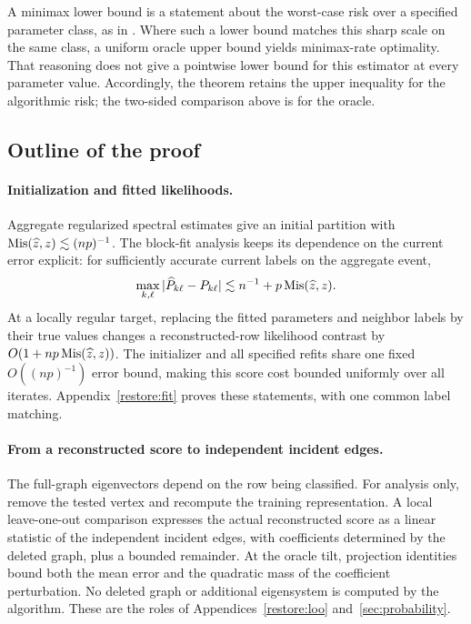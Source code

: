 A minimax lower bound is a statement about the worst-case risk over
a specified parameter class, as in
\citep{zhangzhou2016,zhouli,zhouamini2020}. Where such a lower bound
matches this sharp scale on the same class, a uniform oracle upper
bound yields minimax-rate optimality. That reasoning does not give
a pointwise lower bound for this estimator at every parameter value.
Accordingly, the theorem retains the upper inequality for the
algorithmic risk; the two-sided comparison above is for the oracle.

\subsection{Outline of the proof}\label{sec:proof-strategy}

\paragraph{Initialization and fitted likelihoods.}
Aggregate regularized spectral estimates give an initial partition
with $\operatorname{Mis}(\widehat z,z)\lesssim (np)^{-1}$. The block-fit analysis keeps its
dependence on the current error explicit: for sufficiently accurate current labels on the aggregate event,
\[
 \max_{k,\ell}|\widehat P_{k\ell}-P_{k\ell}|
 \lesssim n^{-1}+p\operatorname{Mis}(\widehat z,z).
\]
At a locally regular target, replacing the fitted parameters and
neighbor labels by their true values changes a reconstructed-row
likelihood contrast by $O(1+np\operatorname{Mis}(\widehat z,z))$. The initializer
and all specified refits share one fixed $O((np)^{-1})$ error bound,
making this score cost
bounded uniformly over all iterates. Appendix~\ref{restore:fit}
proves these statements, with one common label matching.

\paragraph{From a reconstructed score to independent incident edges.}
The full-graph eigenvectors depend on the row being classified.
For analysis only, remove the tested vertex and recompute the training
representation. A local leave-one-out comparison expresses the actual
reconstructed score as a linear statistic of the independent incident
edges, with coefficients determined by the deleted graph, plus a
bounded remainder. At the oracle tilt, projection identities bound
both the mean error and the quadratic mass of the coefficient
perturbation. No deleted graph or additional eigensystem is computed
by the algorithm. These are the roles of Appendices~\ref{restore:loo}
and~\ref{sec:probability}.

